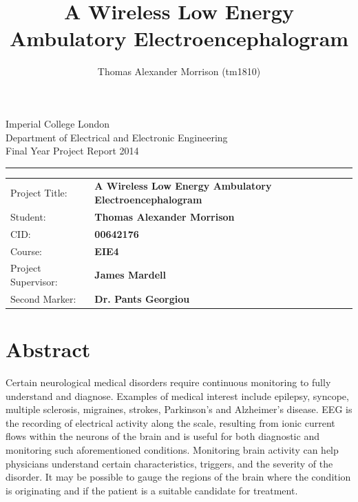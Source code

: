 \documentclass[]{article}
\title{A Wireless  Low Energy Ambulatory Electroencephalogram}
\author{Thomas Alexander Morrison (tm1810)}
\begin{document}
\begin{titlepage}
\setlength{\parindent}{0pt}
\setlength{\parskip}{0pt}

{
\Large
\raggedright
Imperial College London\\[17pt]
Department of Electrical and Electronic Engineering\\[17pt]
Final Year Project Report 2014\\[17pt]

}
\rule{\columnwidth}{3pt}

\vfill

\centering

\vfill

\setlength{\tabcolsep}{0pt}
\begin{tabular}{p{40mm}p{\dimexpr\columnwidth-40mm}}
Project Title: & \textbf{A Wireless  Low Energy Ambulatory Electroencephalogram} \\[12pt]
Student: & \textbf{Thomas Alexander Morrison} \\[12pt]
CID: & \textbf{00642176} \\[12pt]
Course: & \textbf{EIE4} \\[12pt]
Project Supervisor: & \textbf{James Mardell} \\[12pt]
Second Marker: & \textbf{Dr. Pants Georgiou} \\
\end{tabular}
\end{titlepage}

\clearpage





\clearpage

\section*{Abstract}
Certain neurological medical disorders require continuous monitoring to fully understand and diagnose. Examples of medical interest include epilepsy, syncope, multiple sclerosis, migraines, strokes, Parkinson’s and Alzheimer’s disease. \ac{EEG} is the recording of electrical activity along the scale, resulting from ionic current flows within the neurons of the brain and is useful for both diagnostic and monitoring such aforementioned conditions. Monitoring brain activity can help physicians understand certain characteristics, triggers, and the severity of the disorder. It may be possible to gauge the regions of the brain where the condition is originating and if the patient is a suitable candidate for treatment. 
\end{document}
